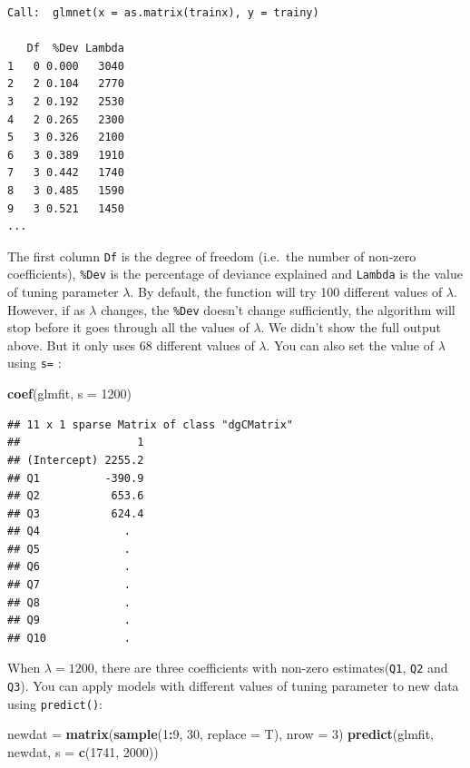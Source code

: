 \documentclass[12pt,]{krantz}
\makeatletter
\newenvironment{Shaded}{\begin{snugshade}}{\end{snugshade}}
\newcommand{\DataTypeTok}[1]{\textcolor[rgb]{0.27,0.27,0.27}{#1}}
\newcommand{\DecValTok}[1]{\textcolor[rgb]{0.06,0.06,0.06}{#1}}
\newcommand{\KeywordTok}[1]{\textcolor[rgb]{0.27,0.27,0.27}{\textbf{#1}}}
\newcommand{\NormalTok}[1]{#1}
\newcommand{\OperatorTok}[1]{\textcolor[rgb]{0.43,0.43,0.43}{\textbf{#1}}}
\newcommand{\StringTok}[1]{\textcolor[rgb]{0.5,0.5,0.5}{#1}}
\newenvironment{kframe}{%
\medskip{}
\setlength{\fboxsep}{.8em}
 \def\at@end@of@kframe{}%
 \ifinner\ifhmode%
  \def\at@end@of@kframe{\end{minipage}}%
  \begin{minipage}{\columnwidth}%
 \fi\fi%
 \def\FrameCommand##1{\hskip\@totalleftmargin \hskip-\fboxsep
 \colorbox{shadecolor}{##1}\hskip-\fboxsep
     \hskip-\linewidth \hskip-\@totalleftmargin \hskip\columnwidth}%
 \MakeFramed {\advance\hsize-\width
   \@totalleftmargin\z@ \linewidth\hsize
   \@setminipage}}%
 {\par\unskip\endMakeFramed%
 \at@end@of@kframe}
\renewenvironment{Shaded}{\begin{kframe}}{\end{kframe}}
\makeatother
\begin{document}
\begin{verbatim}
Call:  glmnet(x = as.matrix(trainx), y = trainy) 

   Df  %Dev Lambda
1   0 0.000   3040
2   2 0.104   2770
3   2 0.192   2530
4   2 0.265   2300
5   3 0.326   2100
6   3 0.389   1910
7   3 0.442   1740
8   3 0.485   1590
9   3 0.521   1450
...
\end{verbatim}

The first column \texttt{Df} is the degree of freedom (i.e.~the number of non-zero coefficients), \texttt{\%Dev} is the percentage of deviance explained and \texttt{Lambda} is the value of tuning parameter \(\lambda\). By default, the function will try 100 different values of \(\lambda\). However, if as \(\lambda\) changes, the \texttt{\%Dev} doesn't change sufficiently, the algorithm will stop before it goes through all the values of \(\lambda\). We didn't show the full output above. But it only uses 68 different values of \(\lambda\). You can also set the value of \(\lambda\) using \texttt{s=} :

\begin{Shaded}
\begin{Highlighting}[]
\KeywordTok{coef}\NormalTok{(glmfit, }\DataTypeTok{s =} \DecValTok{1200}\NormalTok{)}
\end{Highlighting}
\end{Shaded}

\begin{verbatim}
## 11 x 1 sparse Matrix of class "dgCMatrix"
##                  1
## (Intercept) 2255.2
## Q1          -390.9
## Q2           653.6
## Q3           624.4
## Q4             .  
## Q5             .  
## Q6             .  
## Q7             .  
## Q8             .  
## Q9             .  
## Q10            .
\end{verbatim}

When \(\lambda=1200\), there are three coefficients with non-zero estimates(\texttt{Q1}, \texttt{Q2} and \texttt{Q3}). You can apply models with different values of tuning parameter to new data using \texttt{predict()}:

\begin{Shaded}
\begin{Highlighting}[]
\NormalTok{newdat =}\StringTok{ }\KeywordTok{matrix}\NormalTok{(}\KeywordTok{sample}\NormalTok{(}\DecValTok{1}\OperatorTok{:}\DecValTok{9}\NormalTok{, }\DecValTok{30}\NormalTok{, }\DataTypeTok{replace =}\NormalTok{ T), }\DataTypeTok{nrow =} \DecValTok{3}\NormalTok{)}
\KeywordTok{predict}\NormalTok{(glmfit, newdat, }\DataTypeTok{s =} \KeywordTok{c}\NormalTok{(}\DecValTok{1741}\NormalTok{, }\DecValTok{2000}\NormalTok{))}
\end{Highlighting}
\end{Shaded}
\end{document}

